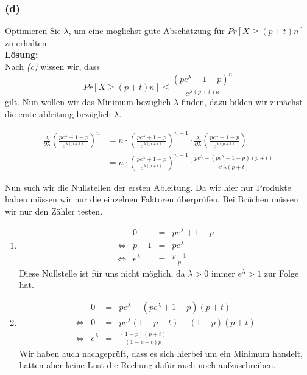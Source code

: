 \documentclass[11pt,a4paper,ngerman]{article}
\begin{document}
\subsubsection*{(d)}

Optimieren Sie $\lambda$, um eine möglichst gute Abschätzung für $Pr[X \geq (p + t)n]$ zu erhalten.\\

\textbf{Lösung:}\\

Nach \emph{(c)} wissen wir, dass
$$
    Pr[ X \geq (p + t)n] \leq \frac{\left( p e^{\lambda} + 1 - p\right)^n}{e^{\lambda (p + t) n}}
$$
gilt. Nun wollen wir das Minimum bezüglich $\lambda$ finden, dazu bilden wir zunächst die erste ableitung bezüglich $\lambda$.

\begin{equation*}\begin{array}{rl}
    \frac{\lambda}{\partial \lambda} \left( \frac{p e^{\lambda} + 1 - p}{e^{\lambda (p + t)}} \right)^n
        &= n \cdot \left( \frac{pe^\lambda + 1 - p}{e^{\lambda (p + t)}} \right)^{n-1} 
        \cdot \frac{\lambda}{\partial \lambda} \left( \frac{pe^\lambda + 1 - p}{e^{\lambda (p + t)}}\right)\\
        &= n \cdot \left( \frac{pe^\lambda + 1 - p}{e^{\lambda (p + t)}} \right)^{n-1} \cdot
            \frac{pe^\lambda - (pe^\lambda + 1 - p)(p+t)}{e^(\lambda(p+t)}
\end{array}\end{equation*}

Nun such wir die Nullstellen der ersten Ableitung. Da wir hier nur Produkte haben müssen wir nur die einzelnen Faktoren überprüfen.
Bei Brüchen müssen wir nur den Zähler testen.\\

\begin{enumerate}[1. {Fall}]
    \item 
        \begin{equation*}\begin{array}{crcl}
            & 0 &=& pe^\lambda + 1 - p\\
            \Leftrightarrow & p-1 &=& pe^\lambda\\
            \Leftrightarrow & e^\lambda &=& \frac{p-1}{p}
        \end{array}\end{equation*}
        Diese Nullstelle ist für uns nicht möglich, da $\lambda > 0$ immer $e^\lambda > 1$ zur Folge hat.
    \item
        \begin{equation*}\begin{array}{crcl}
            & 0 &=& pe^\lambda - (pe^\lambda + 1 -p)(p+t)\\
            \Leftrightarrow & 0 &=& pe^\lambda (1 - p - t) - (1-p)(p+t)\\
            \Leftrightarrow & e^\lambda &=& \frac{(1-p)(p+t)}{(1-p-t)p}
        \end{array}\end{equation*}
        Wir haben auch nachgeprüft, dass es sich hierbei um ein Minimum handelt, hatten aber keine Lust die Rechung dafür auch noch
        aufzuschreiben.
\end{enumerate}
\end{document}
